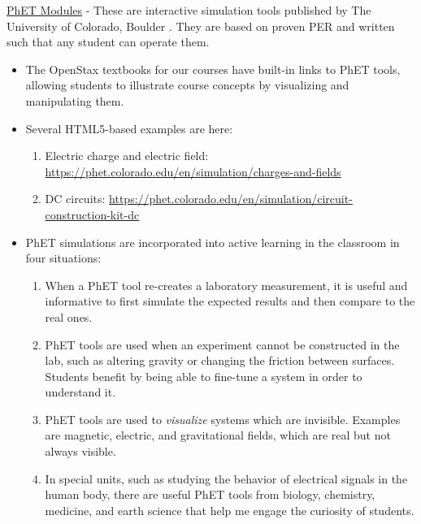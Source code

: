 \documentclass[../../../main.tex]{subfiles}
\begin{document}
\underline{PhET Modules} - These are interactive simulation tools published by The University of Colorado, Boulder \cite{phet}.  They are based on proven PER and written such that any student can operate them.
\begin{itemize}
\item The OpenStax textbooks for our courses have built-in links to PhET tools, allowing students to illustrate course concepts by visualizing and manipulating them.
\item Several HTML5-based examples are here:
\begin{enumerate}
\item Electric charge and electric field: \url{https://phet.colorado.edu/en/simulation/charges-and-fields}
\item DC circuits: \url{https://phet.colorado.edu/en/simulation/circuit-construction-kit-dc}
\end{enumerate}
\item PhET simulations are incorporated into active learning in the classroom in four situations:
\begin{enumerate}
\item When a PhET tool re-creates a laboratory measurement, it is useful and informative to first simulate the expected results and then compare to the real ones.
\item PhET tools are used when an experiment cannot be constructed in the lab, such as altering gravity or changing the friction between surfaces.  Students benefit by being able to fine-tune a system in order to understand it.
\item PhET tools are used to \textit{visualize} systems which are invisible.  Examples are magnetic, electric, and gravitational fields, which are real but not always visible.
\item In special units, such as studying the behavior of electrical signals in the human body, there are useful PhET tools from biology, chemistry, medicine, and earth science that help me engage the curiosity of students.
\end{enumerate}
\end{itemize}
\end{document}
